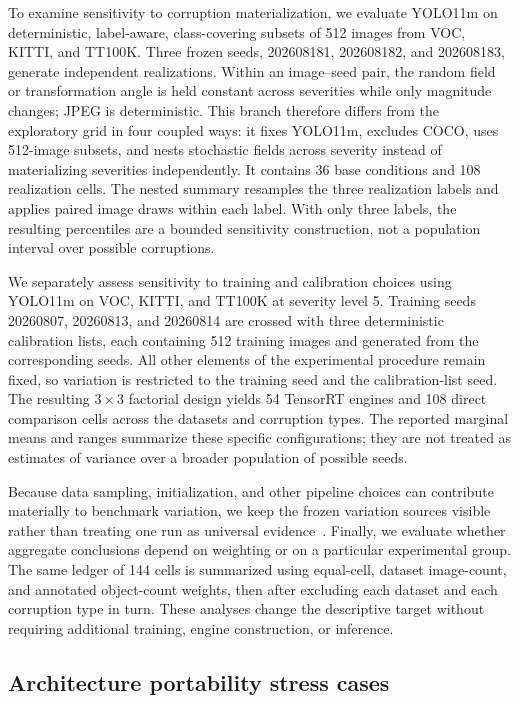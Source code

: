 \documentclass[a4paper,fleqn]{cas-dc}
\begin{document}
To examine sensitivity to corruption materialization, we evaluate YOLO11m on deterministic, label-aware, class-covering subsets of 512 images from VOC, KITTI, and TT100K. Three frozen seeds, 202608181, 202608182, and 202608183, generate independent realizations. Within an image--seed pair, the random field or transformation angle is held constant across severities while only magnitude changes; JPEG is deterministic. This branch therefore differs from the exploratory grid in four coupled ways: it fixes YOLO11m, excludes COCO, uses 512-image subsets, and nests stochastic fields across severity instead of materializing severities independently. It contains 36 base conditions and 108 realization cells. The nested summary resamples the three realization labels and applies paired image draws within each label. With only three labels, the resulting percentiles are a bounded sensitivity construction, not a population interval over possible corruptions.

We separately assess sensitivity to training and calibration choices using YOLO11m on VOC, KITTI, and TT100K at severity level 5. Training seeds 20260807, 20260813, and 20260814 are crossed with three deterministic calibration lists, each containing 512 training images and generated from the corresponding seeds. All other elements of the experimental procedure remain fixed, so variation is restricted to the training seed and the calibration-list seed. The resulting $3\times3$ factorial design yields 54 TensorRT engines and 108 direct comparison cells across the datasets and corruption types. The reported marginal means and ranges summarize these specific configurations; they are not treated as estimates of variance over a broader population of possible seeds.

Because data sampling, initialization, and other pipeline choices can contribute materially to benchmark variation, we keep the frozen variation sources visible rather than treating one run as universal evidence~\citep{bouthillier2021variance}. Finally, we evaluate whether aggregate conclusions depend on weighting or on a particular experimental group. The same ledger of 144 cells is summarized using equal-cell, dataset image-count, and annotated object-count weights, then after excluding each dataset and each corruption type in turn. These analyses change the descriptive target without requiring additional training, engine construction, or inference.

\subsection{Architecture portability stress cases}
\label{sec:crossfamily-methods}
\end{document}
